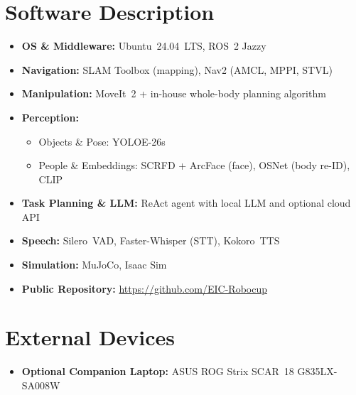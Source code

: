 \vspace{1pt}

\section*{Software Description}
\begin{itemize}[noitemsep,topsep=1pt,leftmargin=1.1em]
    \item \textbf{OS \& Middleware:} Ubuntu~24.04~LTS, ROS~2 Jazzy
    \item \textbf{Navigation:} SLAM Toolbox (mapping), Nav2 (AMCL, MPPI, STVL)
    \item \textbf{Manipulation:} MoveIt~2 + in-house whole-body planning algorithm
    \item \textbf{Perception:}
    \begin{itemize}[noitemsep,topsep=0pt,leftmargin=1.2em]
        \item Objects \& Pose: YOLOE-26s
        \item People \& Embeddings: SCRFD + ArcFace (face), OSNet (body re-ID), CLIP
    \end{itemize}
    \item \textbf{Task Planning \& LLM:} ReAct agent with local LLM and optional cloud API
    \item \textbf{Speech:} Silero~VAD, Faster-Whisper (STT), Kokoro~TTS
    \item \textbf{Simulation:} MuJoCo, Isaac Sim
    \item \textbf{Public Repository:} \url{https://github.com/EIC-Robocup}
\end{itemize}
  
\vspace{1pt}
\section*{External Devices}
\begin{itemize}[noitemsep,topsep=1pt,leftmargin=1.1em]
    \item \textbf{Optional Companion Laptop:} ASUS ROG Strix SCAR~18 G835LX-SA008W
\end{itemize}
\endgroup
